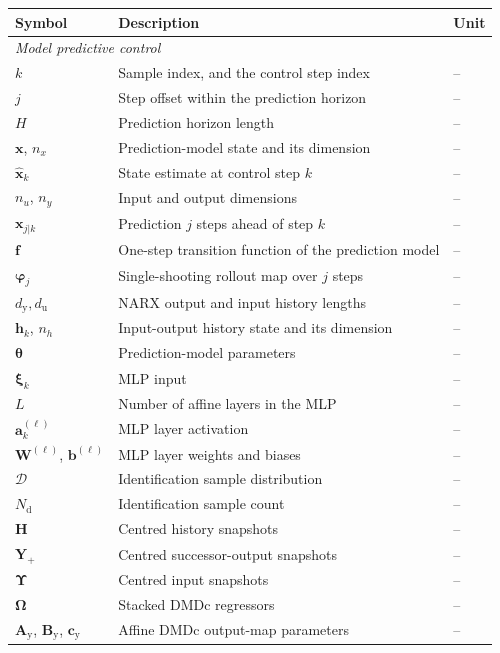 \begin{tabular}{lll}
    \toprule
    Symbol & Description & Unit \\
    \midrule
    \multicolumn{3}{l}{\itshape Model predictive control} \\
    $k$ & Sample index, and the control step index & -- \\
    $j$ & Step offset within the prediction horizon & -- \\
    $H$ & Prediction horizon length & -- \\
    $\mathbf{x}$, $n_x$ & Prediction-model state and its dimension & -- \\
    $\hat{\mathbf{x}}_k$ & State estimate at control step $k$ & -- \\
    $n_u$, $n_y$ & Input and output dimensions & -- \\
    $\mathbf{x}_{j|k}$ & Prediction $j$ steps ahead of step $k$ & -- \\
    $\mathbf{f}$ & One-step transition function of the prediction model & -- \\
    $\boldsymbol{\varphi}_j$ & Single-shooting rollout map over $j$ steps & -- \\
    $d_\mathrm{y}, d_\mathrm{u}$ & NARX output and input history lengths & -- \\
    $\mathbf{h}_k$, $n_h$ & Input-output history state and its dimension & -- \\
    $\boldsymbol{\theta}$ & Prediction-model parameters & -- \\
    $\boldsymbol{\xi}_k$ & MLP input & -- \\
    $L$ & Number of affine layers in the MLP & -- \\
    $\mathbf{a}^{(\ell)}_k$ & MLP layer activation & -- \\
    $\mathbf{W}^{(\ell)}$, $\mathbf{b}^{(\ell)}$ & MLP layer weights and biases & -- \\
    $\mathcal{D}$ & Identification sample distribution & -- \\
    $N_\mathrm{d}$ & Identification sample count & -- \\
    $\mathbf{H}$ & Centred history snapshots & -- \\
    $\mathbf{Y}_+$ & Centred successor-output snapshots & -- \\
    $\boldsymbol{\Upsilon}$ & Centred input snapshots & -- \\
    $\boldsymbol{\Omega}$ & Stacked DMDc regressors & -- \\
    $\mathbf{A}_\mathrm{y}$, $\mathbf{B}_\mathrm{y}$, $\mathbf{c}_\mathrm{y}$ & Affine DMDc output-map parameters & -- \\

\end{tabular}
